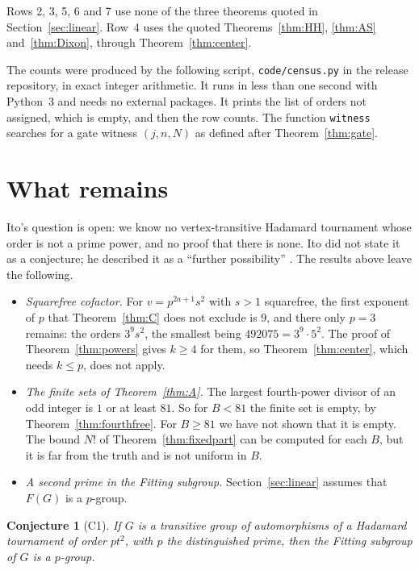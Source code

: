 \documentclass[11pt]{amsart}
\newtheorem{conjecture}[theorem]{Conjecture}
\theoremstyle{definition}
\theoremstyle{remark}
\begin{document}
Rows 2, 3, 5, 6 and 7 use none of the three theorems quoted in Section~\ref{sec:linear}. Row~4 uses the quoted Theorems~\ref{thm:HH}, \ref{thm:AS} and~\ref{thm:Dixon}, through Theorem~\ref{thm:center}.

The counts were produced by the following script, \texttt{code/census.py} in the release repository, in exact integer arithmetic. It runs in less than one second with Python~3 and needs no external packages. It prints the list of orders not assigned, which is empty, and then the row counts. The function \texttt{witness} searches for a gate witness $(j,n,N)$ as defined after Theorem~\ref{thm:gate}.

{\footnotesize}

\section{What remains}\label{sec:conj}

Ito's question is open: we know no vertex-transitive Hadamard tournament whose order is not a prime power, and no proof that there is none. Ito did not state it as a conjecture; he described it as a ``further possibility'' \cite[p.~41]{Ito84}. The results above leave the following.
\begin{itemize}
\item \emph{Squarefree cofactor.} For $v=p^{2a+1}s^2$ with $s>1$ squarefree, the first exponent of $p$ that Theorem~\ref{thm:C} does not exclude is $9$, and there only $p=3$ remains: the orders $3^9s^2$, the smallest being $492075=3^9\cdot5^2$. The proof of Theorem~\ref{thm:powers} gives $k\ge4$ for them, so Theorem~\ref{thm:center}, which needs $k\le p$, does not apply.
\item \emph{The finite sets of Theorem~\ref{thm:A}.} The largest fourth-power divisor of an odd integer is $1$ or at least $81$. So for $B<81$ the finite set is empty, by Theorem~\ref{thm:fourthfree}. For $B\ge81$ we have not shown that it is empty. The bound $N!$ of Theorem~\ref{thm:fixedpart} can be computed for each $B$, but it is far from the truth and is not uniform in $B$.
\item \emph{A second prime in the Fitting subgroup.} Section~\ref{sec:linear} assumes that $F(G)$ is a $p$-group.
\end{itemize}

\begin{conjecture}[C1]\label{conj:fitting}
If $G$ is a transitive group of automorphisms of a Hadamard tournament of order $pt^2$, with $p$ the distinguished prime, then the Fitting subgroup of $G$ is a $p$-group.
\end{conjecture}
\end{document}
